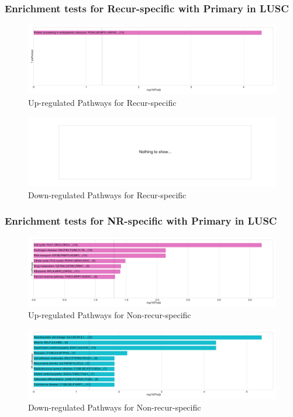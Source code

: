 \documentclass{beamer}
\begin{document}
    \begin{frame}
        \frametitle{Enrichment tests for Recur-specific with Primary in LUSC}

        \begin{figure}
            \includegraphics[width=0.8 \linewidth]{figures/DEG/Enrichment/STAR.FPKM.SQC-Primary.Recur.Up.KEGG.pdf}
            \caption{Up-regulated Pathways for Recur-specific}
        \end{figure}

        \begin{figure}
            \includegraphics[width=0.8 \linewidth]{figures/DEG/Enrichment/STAR.FPKM.SQC-Primary.Recur.Down.KEGG.pdf}
            \caption{Down-regulated Pathways for Recur-specific}
        \end{figure}
    \end{frame}

    \begin{frame}
        \frametitle{Enrichment tests for NR-specific with Primary in LUSC}

        \begin{figure}
            \includegraphics[width=0.8 \linewidth]{figures/DEG/Enrichment/STAR.FPKM.SQC-Primary.Nonrecur.Up.KEGG.pdf}
            \caption{Up-regulated Pathways for Non-recur-specific}
        \end{figure}

        \begin{figure}
            \includegraphics[width=0.8 \linewidth]{figures/DEG/Enrichment/STAR.FPKM.SQC-Primary.Nonrecur.Down.KEGG.pdf}
            \caption{Down-regulated Pathways for Non-recur-specific}
        \end{figure}
    \end{frame}
\end{document}
